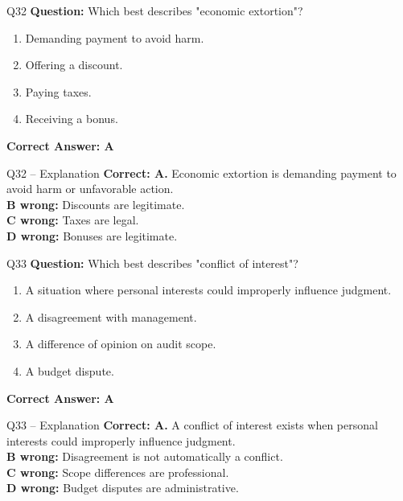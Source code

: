 \documentclass[aspectratio=169,10pt]{beamer}
\begin{document}
	\begin{frame}[t]{Q32}
		\small
		\textbf{Question:} Which best describes "economic extortion"?
		\begin{enumerate}[label=\Alph*.,itemsep=1pt,topsep=2pt]
			\item Demanding payment to avoid harm.
			\item Offering a discount.
			\item Paying taxes.
			\item Receiving a bonus.
		\end{enumerate}
		\vspace{4pt}
		\textbf{Correct Answer: A}
	\end{frame}
	
	\begin{frame}[t]{Q32 -- Explanation}
		\small
		\textbf{Correct: A.} Economic extortion is demanding payment to avoid harm or unfavorable action. \\[4pt]
		\textbf{B wrong:} Discounts are legitimate. \\[2pt]
		\textbf{C wrong:} Taxes are legal. \\[2pt]
		\textbf{D wrong:} Bonuses are legitimate.
	\end{frame}
	
	\begin{frame}[t]{Q33}
		\small
		\textbf{Question:} Which best describes "conflict of interest"?
		\begin{enumerate}[label=\Alph*.,itemsep=1pt,topsep=2pt]
			\item A situation where personal interests could improperly influence judgment.
			\item A disagreement with management.
			\item A difference of opinion on audit scope.
			\item A budget dispute.
		\end{enumerate}
		\vspace{4pt}
		\textbf{Correct Answer: A}
	\end{frame}
	
	\begin{frame}[t]{Q33 -- Explanation}
		\small
		\textbf{Correct: A.} A conflict of interest exists when personal interests could improperly influence judgment. \\[4pt]
		\textbf{B wrong:} Disagreement is not automatically a conflict. \\[2pt]
		\textbf{C wrong:} Scope differences are professional. \\[2pt]
		\textbf{D wrong:} Budget disputes are administrative.
	\end{frame}
	
\end{document}
